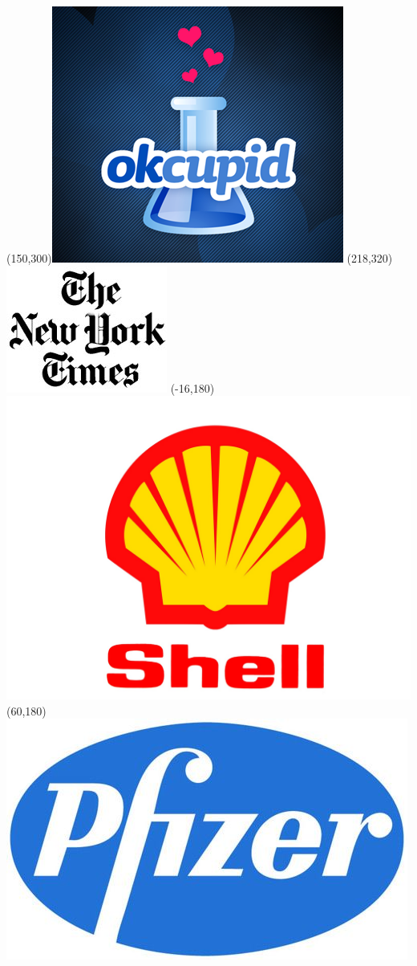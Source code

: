 \begin{frame}
\Put(150,300){\includegraphics[scale=.2]{../common/pics/R_using_logos/okcupid}}
\Put(218,320){\includegraphics[scale=.35]{../common/pics/R_using_logos/nyt}}
\Put(-16,180){\includegraphics[scale=.05]{../common/pics/R_using_logos/shell}}
\Put(60,180){\includegraphics[scale=.2]{../common/pics/R_using_logos/pfizer}}

\end{frame}
